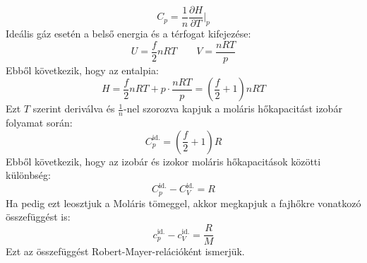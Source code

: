 \documentclass[a4paper,12pt]{article}
\begin{document}
\begin{equation}
    C_p = \frac{1}{n} \frac{\partial H}{\partial T}\bigg|_{p}
\end{equation}
Ideális gáz esetén a belső energia és a térfogat kifejezése:
\begin{equation}
    U = \frac{f}{2} n R T \qquad V = \frac{n R T}{p}
\end{equation}
Ebből következik, hogy az entalpia:
\begin{equation}
    H = \frac{f}{2} n R T + p \cdot \frac{n R T}{p} = \left(\frac{f}{2} + 1\right) n R T
\end{equation}
Ezt $T$ szerint deriválva és $\frac{1}{n}$-nel szorozva kapjuk a moláris hőkapacitást izobár folyamat során:
\begin{equation}
    C^{\text{id.}}_p = \left(\frac{f}{2} + 1\right) R
\end{equation}
Ebből következik, hogy az izobár és izokor moláris hőkapacitások közötti különbség:
\begin{equation}
    C^{\text{id.}}_p - C^{\text{id.}}_V = R
\end{equation}
Ha pedig ezt leosztjuk a Moláris tömeggel, akkor megkapjuk a fajhőkre vonatkozó összefüggést is:
\begin{equation}
    c^{\text{id.}}_p - c^{\text{id.}}_V = \frac{R}{M}
\end{equation}
Ezt az összefüggést Robert-Mayer-relációként ismerjük.
\end{document}
